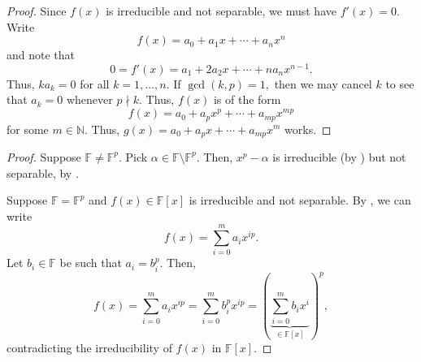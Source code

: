 \nonseppowerp*\label{prop:nonseppowerp2}
\begin{flushright}\hyperref[prop:nonseppowerp]{\upsym}\end{flushright}
\begin{proof}
    Since $f(x)$ is irreducible and not separable, we must have $f'(x) = 0.$ Write
    \begin{equation*} 
        f(x) = a_0 + a_1x + \cdots + a_nx^n
    \end{equation*}
    and note that
    \begin{equation*} 
        0 = f'(x) = a_1 + 2a_2x + \cdots + n a_n x^{n - 1}.
    \end{equation*}
    Thus, $ka_k = 0$ for all $k = 1, \ldots, n.$ If $\gcd(k, p) = 1,$ then we may cancel $k$ to see that $a_k = 0$ whenever $p \nmid k.$ Thus, $f(x)$ is of the form
    \begin{equation*} 
        f(x) = a_0 + a_px^p + \cdots + a_{mp} x^{mp}
    \end{equation*}
    for some $m \in \mathbb{N}.$ Thus, $g(x) = a_0 + a_p x + \cdots + a_{mp} x^m$ works.
\end{proof}

\perfectiffppower*\label{thm:perfectiffppower2}
\begin{flushright}\hyperref[thm:perfectiffppower]{\upsym}\end{flushright}
\begin{proof}
    \forward Suppose $\mathbb{F} \neq \mathbb{F}^p.$ Pick $\alpha \in \mathbb{F} \setminus \mathbb{F}^p.$ Then, $x^p - \alpha$ is irreducible (by ) but not separable, by .

    \backward Suppose $\mathbb{F} = \mathbb{F}^p$ and $f(x) \in \mathbb{F}[x]$ is irreducible and not separable. By , we can write 
    \begin{equation*} 
        f(x) = \sum_{i = 0}^{m} a_i x^{ip}.
    \end{equation*} 
    Let $b_i \in \mathbb{F}$ be such that $a_i = b_i^p.$ Then,
    \begin{equation*} 
        f(x) = \sum_{i = 0}^{m} a_i x^{ip} = \sum_{i = 0}^{m} b_i^p x^{ip} = \left(\underbrace{\sum_{i = 0}^{m}b_i x^i}_{\in \mathbb{F}[x]}\right)^p,
    \end{equation*}
    contradicting the irreducibility of $f(x)$ in $\mathbb{F}[x].$
\end{proof}

